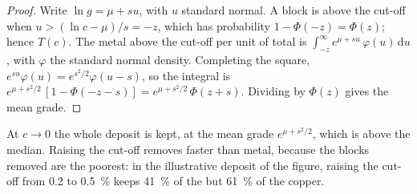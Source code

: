 \begin{proof}
Write $\ln g = \mu + s u$, with $u$ standard normal. A block is above the cut-off when $u > (\ln c -
\mu)/s = -z$, which has probability $1 - \Phi(-z) = \Phi(z)$; hence $T(c)$. The metal above the
cut-off per unit of total  is $\int_{-z}^{\infty} e^{\mu + s u}\,\varphi(u)\,\mathrm{d}u$,
with $\varphi$ the standard normal density. Completing the square, $e^{su}\varphi(u) =
e^{s^2/2}\varphi(u - s)$, so the integral is $e^{\mu + s^2/2}\,[1 - \Phi(-z - s)] = e^{\mu +
s^2/2}\,\Phi(z + s)$. Dividing by $\Phi(z)$ gives the mean grade.
\end{proof}

At $c \to 0$ the whole deposit is kept, at the mean grade $e^{\mu + s^2/2}$, which is above the
median. Raising the cut-off removes  faster than metal, because the blocks removed are the
poorest: in the illustrative deposit of the figure, raising the cut-off from 0.2 to
\qty{0.5}{\percent} keeps \qty{41}{\percent} of the  but \qty{61}{\percent} of the copper.

